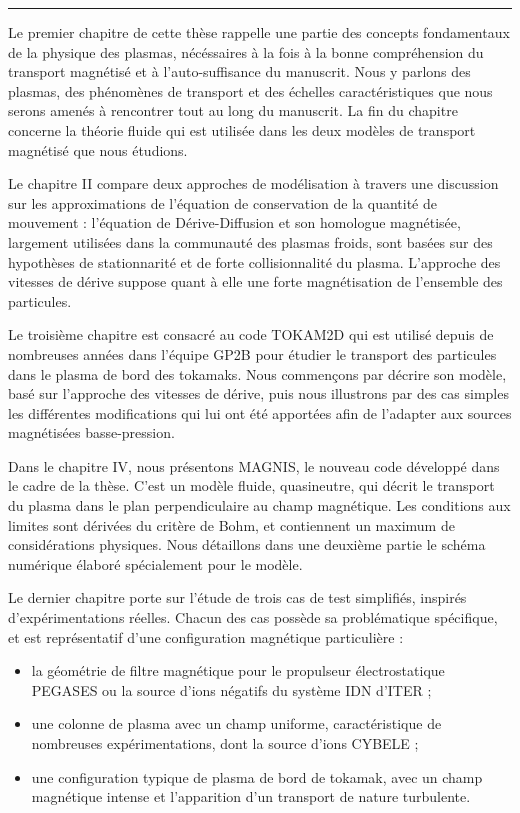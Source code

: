 \begin{refsection}
\begin{center}
\rule{0.6\textwidth}{1pt}
\end{center}	

	Le premier chapitre de cette thèse rappelle une partie des concepts 
	fondamentaux de la physique des plasmas, nécéssaires à la fois à la bonne
	compréhension du transport magnétisé et à l'auto-suffisance du manuscrit. Nous
	y parlons des plasmas, des phénomènes de transport et des échelles
	caractéristiques que nous serons amenés à rencontrer tout au long du manuscrit.
	La fin du chapitre concerne la théorie fluide qui est utilisée dans les deux
	modèles de transport magnétisé que nous étudions.
	
	Le chapitre II compare deux approches de modélisation à travers une
	discussion sur les approximations de l'équation de conservation de la quantité
	de mouvement : l'équation de Dérive-Diffusion et son homologue magnétisée,
	largement utilisées dans la communauté des plasmas froids, sont basées sur des
	hypothèses de stationnarité et de forte collisionnalité du plasma. L'approche
	des vitesses de dérive suppose quant à elle une forte magnétisation de
	l'ensemble des particules.
	
	Le troisième chapitre est consacré au code TOKAM2D qui est utilisé depuis de
	nombreuses années dans l'équipe GP2B pour étudier le transport des particules
	dans le plasma de bord des tokamaks. Nous commençons par décrire son modèle,
	basé sur l'approche des vitesses de dérive, puis nous illustrons par des cas
	 simples les différentes modifications qui lui ont été apportées afin de
	 l'adapter aux sources magnétisées basse-pression.
	
	Dans le chapitre IV, nous présentons MAGNIS, le nouveau code développé dans le
	cadre de la thèse. C'est un modèle fluide, quasineutre, qui décrit le transport
	du plasma dans le plan perpendiculaire au champ magnétique. Les conditions aux
	limites sont dérivées du critère de Bohm, et contiennent un maximum de
	considérations physiques. Nous détaillons dans une deuxième partie le schéma
	numérique élaboré spécialement pour le modèle.
	
	 Le dernier chapitre porte sur l'étude de trois cas de test simplifiés,
inspirés d'expérimentations réelles. Chacun des cas possède sa problématique
spécifique, et est représentatif d'une configuration magnétique
particulière :
\begin{itemize}
  \item la géométrie de filtre magnétique pour le propulseur électrostatique PEGASES
		ou la source d'ions négatifs du système IDN d'ITER ;
		\item une colonne de plasma avec un champ uniforme, caractéristique de
		nombreuses expérimentations, dont la source d'ions CYBELE ;
		\item une configuration typique de plasma de bord de tokamak, avec un champ
		magnétique intense et l'apparition d'un transport de nature turbulente.
\end{itemize}


%
%
\end{refsection}

